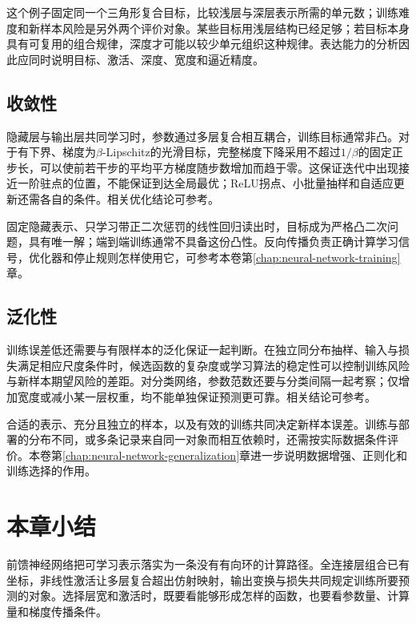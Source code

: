 这个例子固定同一个三角形复合目标，比较浅层与深层表示所需的单元数；训练难度和新样本风险是另外两个评价对象。某些目标用浅层结构已经足够；若目标本身具有可复用的组合规律，深度才可能以较少单元组织这种规律。表达能力的分析因此应同时说明目标、激活、深度、宽度和逼近精度。


\subsection{收敛性}
\label{sec:ffn-convergence}

隐藏层与输出层共同学习时，参数通过多层复合相互耦合，训练目标通常非凸。对于有下界、梯度为$\beta$-Lipschitz的光滑目标，完整梯度下降采用不超过$1/\beta$的固定正步长，可以使前若干步的平均平方梯度随步数增加而趋于零。这保证迭代中出现接近一阶驻点的位置，不能保证到达全局最优；ReLU拐点、小批量抽样和自适应更新还需各自的条件。相关优化结论可参考。

固定隐藏表示、只学习带正二次惩罚的线性回归读出时，目标成为严格凸二次问题，具有唯一解；端到端训练通常不具备这份凸性。反向传播负责正确计算学习信号，优化器和停止规则怎样使用它，可参考本卷第\ref{chap:neural-network-training}章。

\subsection{泛化性}
\label{sec:ffn-learnability}

训练误差低还需要与有限样本的泛化保证一起判断。在独立同分布抽样、输入与损失满足相应尺度条件时，候选函数的复杂度或学习算法的稳定性可以控制训练风险与新样本期望风险的差距。对分类网络，参数范数还要与分类间隔一起考察；仅增加宽度或减小某一层权重，均不能单独保证预测更可靠。相关结论可参考。

合适的表示、充分且独立的样本，以及有效的训练共同决定新样本误差。训练与部署的分布不同，或多条记录来自同一对象而相互依赖时，还需按实际数据条件评价。本卷第\ref{chap:neural-network-generalization}章进一步说明数据增强、正则化和训练选择的作用。

\section{本章小结}
\label{sec:ffn-summary}

前馈神经网络把可学习表示落实为一条没有有向环的计算路径。全连接层组合已有坐标，非线性激活让多层复合超出仿射映射，输出变换与损失共同规定训练所要预测的对象。选择层宽和激活时，既要看能够形成怎样的函数，也要看参数量、计算量和梯度传播条件。

